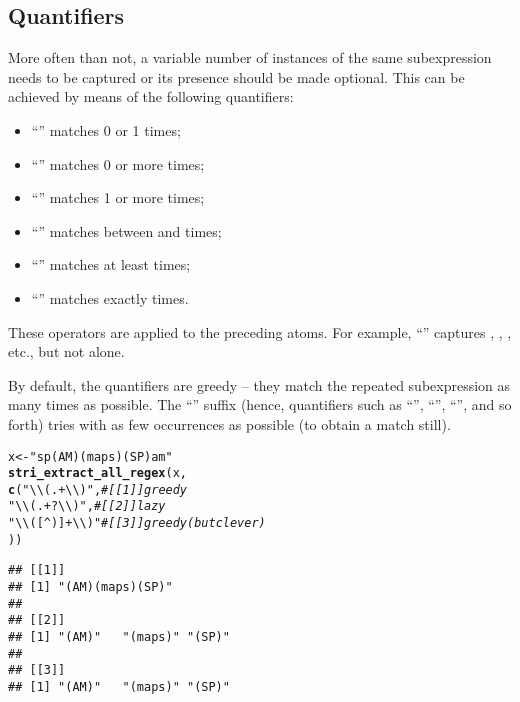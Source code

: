 \documentclass[nojss]{jss}\usepackage[]{graphicx}\usepackage[]{xcolor}
\makeatletter
\newcommand{\hlstr}[1]{\textcolor[rgb]{0.192,0.494,0.8}{#1}}%
\newcommand{\hlcom}[1]{\textcolor[rgb]{0.678,0.584,0.686}{\textit{#1}}}%
\newcommand{\hlstd}[1]{\textcolor[rgb]{0.345,0.345,0.345}{#1}}%
\newcommand{\hlkwb}[1]{\textcolor[rgb]{0.69,0.353,0.396}{#1}}%
\newcommand{\hlkwd}[1]{\textcolor[rgb]{0.737,0.353,0.396}{\textbf{#1}}}%
\newenvironment{kframe}{%
 \def\at@end@of@kframe{}%
 \ifinner\ifhmode%
  \def\at@end@of@kframe{\end{minipage}}%
  \begin{minipage}{\columnwidth}%
 \fi\fi%
 \def\FrameCommand##1{\hskip\@totalleftmargin \hskip-\fboxsep
 \colorbox{shadecolor}{##1}\hskip-\fboxsep
     \hskip-\linewidth \hskip-\@totalleftmargin \hskip\columnwidth}%
 \MakeFramed {\advance\hsize-\width
   \@totalleftmargin\z@ \linewidth\hsize
   \@setminipage}}%
 {\par\unskip\endMakeFramed%
 \at@end@of@kframe}
\newenvironment{knitrout}{}{} %
\makeatother
\begin{document}
\subsection{Quantifiers}

More often than not, a variable number of
instances of the same subexpression needs to be captured
or its presence should be made optional.
This can be achieved by means of the following quantifiers:
\begin{itemize}
\item ``'' matches 0 or 1 times;
\item ``\code{*}'' matches 0 or more times;
\item ``\code{+}'' matches 1 or more times;
\item ``'' matches between  and  times;
\item ``'' matches at least  times;
\item ``'' matches exactly  times.
\end{itemize}
These operators are applied to the preceding atoms.
For example, ``'' captures
, , , etc., but not  alone.


By default, the quantifiers are greedy -- they match the
repeated subexpression as many times as possible. The ``'' suffix
(hence, quantifiers such as ``'', ``'', ``'', and so forth) tries with
as few occurrences as possible (to obtain a match still).


\begin{knitrout}
\color{fgcolor}\begin{kframe}
\begin{alltt}
\hlstd{x} \hlkwb{<-} \hlstr{"sp(AM)(maps)(SP)am"}
\hlkwd{stri_extract_all_regex}\hlstd{(x,}
  \hlkwd{c}\hlstd{(}\hlstr{"\textbackslash{}\textbackslash{}(.+\textbackslash{}\textbackslash{})"}\hlstd{,}    \hlcom{# [[1]] greedy}
    \hlstr{"\textbackslash{}\textbackslash{}(.+?\textbackslash{}\textbackslash{})"}\hlstd{,}   \hlcom{# [[2]] lazy}
    \hlstr{"\textbackslash{}\textbackslash{}([^)]+\textbackslash{}\textbackslash{})"}  \hlcom{# [[3]] greedy (but clever)}
\hlstd{))}
\end{alltt}
\begin{verbatim}
## [[1]]
## [1] "(AM)(maps)(SP)"
## 
## [[2]]
## [1] "(AM)"   "(maps)" "(SP)"  
## 
## [[3]]
## [1] "(AM)"   "(maps)" "(SP)"
\end{verbatim}
\end{kframe}
\end{knitrout}
\end{document}
